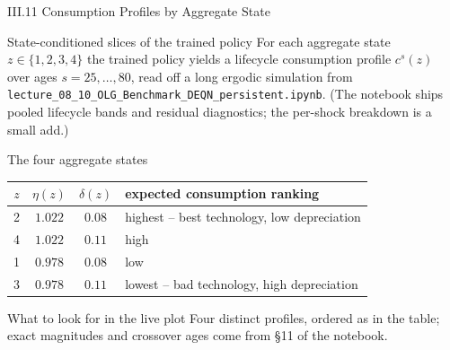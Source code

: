 \documentclass[aspectratio=169,11pt]{beamer}
\newcommand{\emphc}[1]{\textcolor{harvardcrimson}{#1}}
\begin{document}
\begin{frame}{III.11 Consumption Profiles by Aggregate State}
\footnotesize
\begin{block}{State-conditioned slices of the trained policy}
\vspace{-3pt}
For each aggregate state $z \in \{1,2,3,4\}$ the trained policy yields a lifecycle consumption profile $c^s(z)$ over ages $s=25,\ldots,80$, read off a long ergodic simulation from \texttt{lecture\_08\_10\_OLG\_Benchmark\_DEQN\_persistent.ipynb}.  (The notebook ships pooled lifecycle bands and residual diagnostics; the per-shock breakdown is a small add.)
\end{block}

\begin{block}{The four aggregate states}
\vspace{-3pt}
\centering\renewcommand{\arraystretch}{0.95}
\begin{tabular}{cccl}
\toprule
$z$ & $\eta(z)$ & $\delta(z)$ & expected consumption ranking \\
\midrule
2 & $1.022$ & $0.08$ & \emphc{highest} -- best technology, low depreciation \\
4 & $1.022$ & $0.11$ & high \\
1 & $0.978$ & $0.08$ & low \\
3 & $0.978$ & $0.11$ & \emphc{lowest} -- bad technology, high depreciation \\
\bottomrule
\end{tabular}
\end{block}

\begin{alertblock}{What to look for in the live plot}
\vspace{-3pt}
Four distinct profiles, ordered as in the table; exact magnitudes and crossover ages come from \S 11 of the notebook.
\end{alertblock}
\end{frame}
\end{document}
